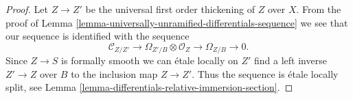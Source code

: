 \documentclass[10pt,a4paper]{amsart}
\theoremstyle{plain}
\theoremstyle{definition}
\theoremstyle{remark}
\numberwithin{equation}{subsection}
\begin{document}
\begin{proof}
Let $Z \to Z'$ be the universal first order thickening of $Z$ over $X$.
From the proof of
Lemma \ref{lemma-universally-unramified-differentials-sequence}
we see that our sequence is identified with the sequence
$$
\mathcal{C}_{Z/Z'} \to \Omega_{Z'/B} \otimes \mathcal{O}_Z \to
\Omega_{Z/B} \to 0.
$$
Since $Z \to S$ is formally smooth we can \'etale locally on $Z'$ find
a left inverse $Z' \to Z$ over $B$ to the inclusion map $Z \to Z'$.
Thus the sequence is \'etale locally split, see
Lemma \ref{lemma-differentials-relative-immersion-section}.
\end{proof}
\end{document}
